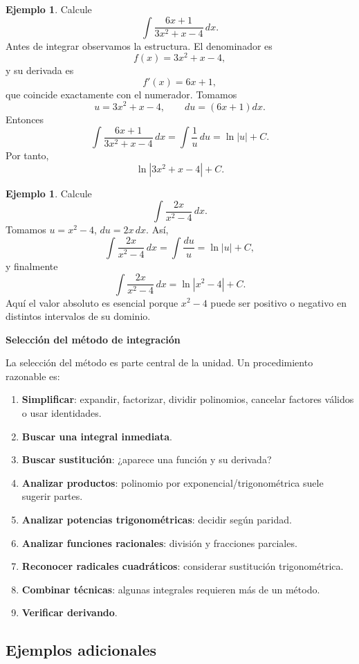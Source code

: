 \documentclass[12pt]{article}
\theoremstyle{definition}
\newtheorem{ejemplo}[teorema]{Ejemplo}
\theoremstyle{remark}
\begin{document}
\begin{ejemplo}
Calcule
\[
\int\frac{6x+1}{3x^2+x-4}\,dx.
\]
Antes de integrar observamos la estructura. El denominador es
\[
f(x)=3x^2+x-4,
\]
y su derivada es
\[
f'(x)=6x+1,
\]
que coincide exactamente con el numerador. Tomamos
\[
u=3x^2+x-4,\qquad du=(6x+1)dx.
\]
Entonces
\[
\int\frac{6x+1}{3x^2+x-4}\,dx
=\int\frac1u\,du
=\ln|u|+C.
\]
Por tanto,
\[
\boxed{\ln|3x^2+x-4|+C}.
\]
\end{ejemplo}

\begin{ejemplo}
Calcule
\[
\int\frac{2x}{x^2-4}\,dx.
\]
Tomamos $u=x^2-4$, $du=2x\,dx$. Así,
\[
\int\frac{2x}{x^2-4}\,dx=\int\frac{du}{u}=\ln|u|+C,
\]
y finalmente
\[
\boxed{\int\frac{2x}{x^2-4}\,dx=\ln|x^2-4|+C.}
\]
Aquí el valor absoluto es esencial porque $x^2-4$ puede ser positivo o negativo en distintos intervalos de su dominio.
\end{ejemplo}

\textbf{Selección del método de integración}

La selección del método es parte central de la unidad. Un procedimiento razonable es:
\begin{enumerate}
\item \textbf{Simplificar}: expandir, factorizar, dividir polinomios, cancelar factores válidos o usar identidades.
\item \textbf{Buscar una integral inmediata}.
\item \textbf{Buscar sustitución}: ¿aparece una función y su derivada?
\item \textbf{Analizar productos}: polinomio por exponencial/trigonométrica suele sugerir partes.
\item \textbf{Analizar potencias trigonométricas}: decidir según paridad.
\item \textbf{Analizar funciones racionales}: división y fracciones parciales.
\item \textbf{Reconocer radicales cuadráticos}: considerar sustitución trigonométrica.
\item \textbf{Combinar técnicas}: algunas integrales requieren más de un método.
\item \textbf{Verificar derivando}.
\end{enumerate}

\subsection*{Ejemplos adicionales}
\end{document}
